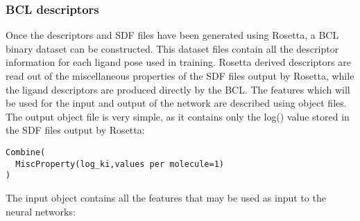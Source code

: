 \subsubsection{\acs{BCL} descriptors}

Once the descriptors and \ac{SDF} files have been generated using Rosetta, a \ac{BCL} binary dataset can be constructed.
This dataset files contain all the descriptor information for each ligand pose used in training.
Rosetta derived descriptors are read out of the miscellaneous properties of the \ac{SDF} files output by Rosetta, while the ligand descriptors are produced directly by the \ac{BCL}.
The features which will be used for the input and output of the network are described using object files.
The output object file is very simple, as it contains only the log(\ki) value stored in the \ac{SDF} files output by Rosetta:
\singlespace
\begin{verbatim}
Combine(
  MiscProperty(log_ki,values per molecule=1)
)
\end{verbatim}
\doublespace
The input object contains all the features that may be used as input to the neural networks:
\singlespace
